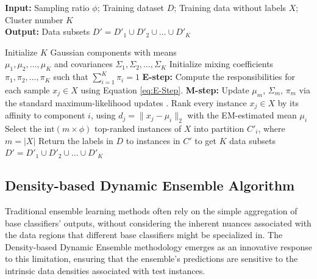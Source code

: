 \documentclass[lettersize,journal]{IEEEtran}
\begin{document}
	\begin{algorithm}[!t]
		\caption{GMM Sampling}
		\label{algo:gmm}
		\textbf{Input:} Sampling ratio $\phi$; Training dataset $D$; Training data without labels $X$; Cluster number $K$ \\
		\textbf{Output:} Data subsets $D' = D'_1 \cup D'_2 \cup \dots \cup D'_K$
		\begin{algorithmic}[1]
			\State Initialize $K$ Gaussian components with means \\
			$\mu_1, \mu_2, \dots, \mu_K$ and covariances $\Sigma_1, \Sigma_2, \dots, \Sigma_K$
			\State Initialize mixing coefficients $\pi_1, \pi_2, \dots, \pi_K$ such that $\sum_{i=1}^{K} \pi_i = 1$
			\Repeat
			\State \textbf{E-step:} Compute the responsibilities for each sample $x_j \in X$ using Equation \ref{eq:E-Step}.
			\State \textbf{M-step:} Update $\mu_m$, $\Sigma_m$, $\pi_m$ via the standard maximum-likelihood updates \cite{dempster_maximum_1977}.
			\State Rank every instance $x_j \in X$ by its affinity to component $i$, using $d_j = \lVert x_j - \mu_i \rVert_2$ with the EM-estimated mean $\mu_i$
			\State Select the $\text{int}(m \times \phi)$ top-ranked instances of $X$ into partition $C'_i$, where $m = |X|$
			\EndFor
			\State {}
			\State Return the labels in $D$ to instances in $C'$ to get $K$ data subsets $D' = D'_1 \cup D'_2 \cup \dots \cup D'_K$
			\EndProcedure
		\end{algorithmic}
	\end{algorithm}
	

	

	\subsection{Density-based Dynamic Ensemble Algorithm}
	\label{subsec:ddel}
	\noindent Traditional ensemble learning methods often rely on the simple aggregation of base classifiers’ outputs, without considering the inherent nuances
	associated with the data regions that different base classifiers might be specialized in. The Density-based Dynamic Ensemble methodology emerges
	as an innovative response to this limitation, ensuring that the ensemble’s
	predictions are sensitive to the intrinsic data densities associated with test
	instances.
	
\end{document}
